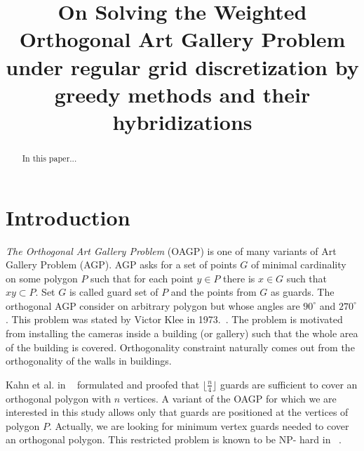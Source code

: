 \documentclass[runningheads,a4paper]{elsarticle}
\begin{document}

    \title{On Solving the Weighted Orthogonal Art Gallery Problem under regular grid discretization by greedy methods and their hybridizations}


    \begin{abstract}
    In this paper...
    \end{abstract}
    \maketitle


    \section{Introduction}\label{sec:introduction}
     \emph{The Orthogonal Art Gallery Problem} (OAGP) is one of many variants of Art Gallery Problem (AGP). AGP asks for a set of points $G$ of minimal cardinality on some polygon $P$ such that for each point $y \in P$ there is $x \in G$ such that $xy \subset P$.  Set $G$ is called guard set of $P$ and the points from $G$ as guards. The orthogonal AGP consider on arbitrary polygon but whose angles are $90^{\circ}$ and $270^{\circ}$. This problem was stated by Victor  Klee in 1973.~\cite{o1987art}. The problem is motivated from installing the cameras inside a building (or gallery) such that the whole area of the building is covered. Orthogonality constraint naturally comes out from the orthogonality of the walls in buildings.

     Kahn et al. in ~\cite{kahn1983traditional} formulated and proofed that 	$\lfloor \frac{n}{4} \rfloor$ guards are  sufficient to cover an orthogonal polygon with $n$ vertices.  A variant of the OAGP for which we are interested in this study allows only that guards are positioned at the vertices of polygon $P$. Actually, we are looking for minimum vertex guards needed to cover an orthogonal polygon. This restricted problem is known to be NP- hard in ~\cite{schuchardt1995two,katz2008guarding}.
\end{document}

